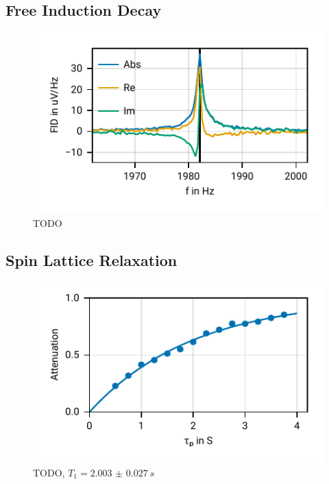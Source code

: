 \documentclass[
    parskip=half, 
    twoside=false,
    twocolumn=true,
    fontsize=11pt,
]{scrarticle}
\begin{document}
\subsection{Free Induction Decay}
\begin{figure}
    \centering
    \includegraphics{figures/02 fid.pdf}
    \caption{TODO}
\end{figure}

\subsection{Spin Lattice Relaxation}
\begin{figure}
    \centering
    \includegraphics{figures/03 T1.pdf}
    \caption{TODO, $T_1 = \SI{2.003(27)}{s}$}
\end{figure}
\end{document}
